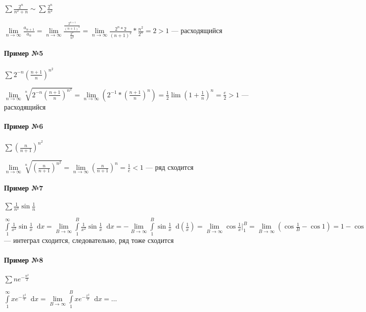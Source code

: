 \documentclass{article}
\newcommand*\diff{\mathop{}\!\mathrm{d}}
\begin{document}
$\sum \frac{2^{n}}{n^2 + n} \sim \sum \frac{2^{n}}{n^2}$

$\lim\limits_{n \to \infty} \frac{a_{n + 1}}{a_{n}} = \lim\limits_{n \to \infty} \frac{\frac{2^{n + 1}}{(n + 1)^2}}{\frac{2^{n}}{n^2}} = \lim\limits_{n \to \infty} \frac{2^n *2}{(n + 1)^2} * \frac{n^2}{2^{n}} = 2 > 1$ — расходящийся

\paragraph{Пример №5}

$\sum 2^{- n} (\frac{n + 1}{n})^{n^2}$

$\lim\limits_{n \to \infty} \sqrt[n]{2^{- n} (\frac{n + 1}{n})^{n^2}} = \lim\limits_{n \to \infty} (2^{-1} * (\frac{n + 1}{n})^{n}) = \frac{1}{2} \lim (1 + \frac{1}{n})^{n} = \frac{e}{2} > 1$ — расходящийся

\paragraph{Пример №6}

$\sum (\frac{n}{n + 1})^{n^2}$

$\lim\limits_{n \to \infty} \sqrt[n]{(\frac{n}{n + 1})^{n^2}} = \lim\limits_{n \to \infty} (\frac{n}{n + 1})^{n} = \frac{1}{e} < 1$ — ряд сходится

\paragraph{Пример №7}

$\sum \frac{1}{n^2} \sin \frac{1}{n}$

$\int\limits_{1}^{\infty} \frac{1}{x^2} \sin \frac{1}{x} \diff x = \lim\limits_{B \to \infty} \int\limits_{1}^{B} \frac{1}{x^2} \sin \frac{1}{x} \diff x = - \lim\limits_{B \to \infty} \int\limits_{1}^{B} \sin \frac{1}{x} \diff (\frac{1}{x}) = \lim\limits_{B \to \infty} \cos \frac{1}{x} \bigg|_{1}^{B} = \lim\limits_{B \to \infty} (\cos \frac{1}{B} - \cos 1) = 1 - \cos 1$ — интеграл сходится, следовательно, ряд тоже сходится

\paragraph{Пример №8}

$\sum n e^{-\frac{n^2}{2}}$

$\int\limits_{1}^{\infty} x e^{-\frac{x^2}{2}} \diff x = \lim\limits_{B \to \infty} \int\limits_{1}^{B} x e^{-\frac{x^2}{2}} \diff x = \dots$
\end{document}

